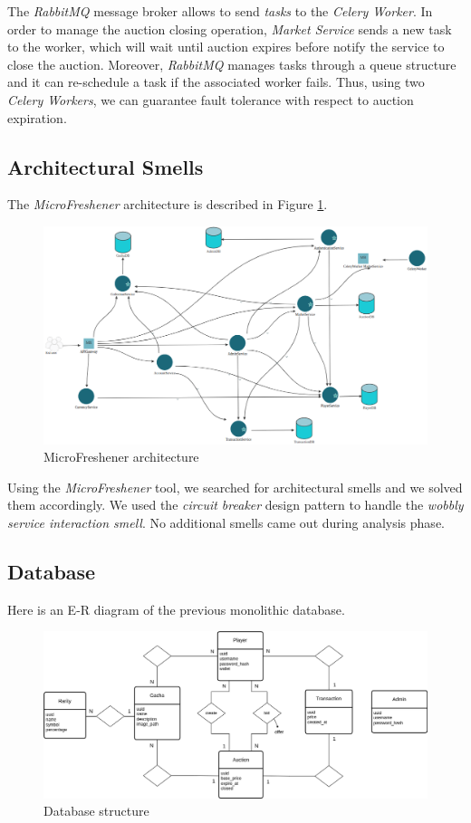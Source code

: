 \documentclass{article}
\begin{document}
The \emph{RabbitMQ} message broker allows to send \emph{tasks} to the \emph{Celery Worker}. In order to manage the auction closing operation, \emph{Market Service} sends a new task to the worker, which will wait until auction expires before notify the service to close the auction. Moreover, \emph{RabbitMQ} manages tasks through a queue structure and it can re-schedule a task if the associated worker fails. Thus, using two \emph{Celery Workers}, we can guarantee fault tolerance with respect to auction expiration.

\subsection{Architectural Smells}
The \emph{MicroFreshener} architecture is described in Figure \ref{fig:microfreshener_architecture}.
\begin{figure}[ht!]
    \centering
    \includegraphics[width=12cm]{microfreshener/microFreshenerArchitecture.png}
    \caption{MicroFreshener architecture}
    \label{fig:microfreshener_architecture}
\end{figure}

Using the \emph{MicroFreshener} tool, we searched for architectural smells and we solved them accordingly. We used the \emph{circuit breaker} design pattern to handle the \emph{wobbly service interaction smell}. No additional smells came out during analysis phase.

\newpage
\subsection{Database}
Here is an E-R diagram of the previous monolithic database.
\begin{figure}[ht]
    \centering
    \includegraphics[width=12cm]{db/ASE-er-v6.png}
    \caption{Database structure}
\end{figure}
\end{document}
